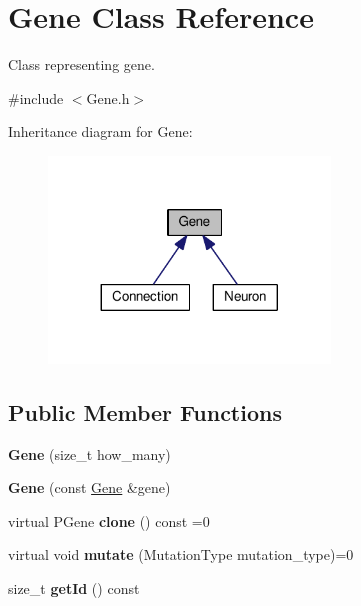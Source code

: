 \hypertarget{classGene}{}\section{Gene Class Reference}
\label{classGene}


Class representing gene.  




{\ttfamily \#include $<$Gene.\+h$>$}



Inheritance diagram for Gene\+:
\nopagebreak
\begin{figure}[H]
\begin{center}
\leavevmode
\includegraphics[width=212pt]{classGene__inherit__graph}
\end{center}
\end{figure}
\subsection*{Public Member Functions}
\begin{DoxyCompactItemize}
\item 
{\bfseries Gene} (size\+\_\+t how\+\_\+many)\hypertarget{classGene_a64133f3ef65cc55daa3bc61085ebdade}{}\label{classGene_a64133f3ef65cc55daa3bc61085ebdade}

\item 
{\bfseries Gene} (const \hyperlink{classGene}{Gene} \&gene)\hypertarget{classGene_a7550abdded94171f54ad084d9d16a5c8}{}\label{classGene_a7550abdded94171f54ad084d9d16a5c8}

\item 
virtual P\+Gene {\bfseries clone} () const =0\hypertarget{classGene_a09f14ad635c9c68390a7e554791b699c}{}\label{classGene_a09f14ad635c9c68390a7e554791b699c}

\item 
virtual void {\bfseries mutate} (Mutation\+Type mutation\+\_\+type)=0\hypertarget{classGene_a92d8b7cf84975c65a12415e13c2eece5}{}\label{classGene_a92d8b7cf84975c65a12415e13c2eece5}

\item 
size\+\_\+t {\bfseries get\+Id} () const \hypertarget{classGene_ac306ce3d6384eed8f4583c05523e39e9}{}\label{classGene_ac306ce3d6384eed8f4583c05523e39e9}

\end{DoxyCompactItemize}

